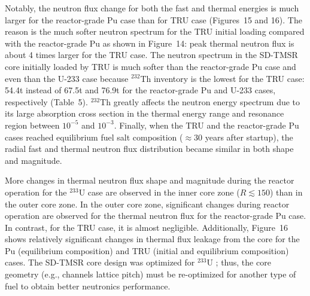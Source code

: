 \documentclass[answers,11pt]{exam}
\begin{document}
\begin{questions}
\begin{solution}
				Notably, the neutron flux change for both the fast and thermal 
				energies is much larger for the reactor-grade Pu case than for 
				TRU case (Figures~15 and 16). The reason is the much softer 
				neutron spectrum for the TRU initial loading compared with the 
				reactor-grade Pu as shown in Figure~14: peak thermal neutron 
				flux is about 4 times larger for the TRU case. The neutron 
				spectrum in the SD-TMSR core initially loaded by TRU is much 
				softer than the reactor-grade Pu case and even than the U-233 
				case because $^{232}$Th inventory is the lowest for the TRU 
				case: 54.4t instead of 67.5t and 76.9t for the reactor-grade  
				Pu and U-233 cases, respectively (Table~5). $^{232}$Th greatly 
				affects the neutron energy spectrum due to its large 
				absorption cross section in the thermal energy range and 
				resonance region between $10^{-5}$ and $10^{-3}$. Finally, 
				when the TRU and the reactor-grade Pu cases reached 
				equilibrium fuel salt composition ($\approx 30$ years after 
				startup), the radial fast and thermal neutron flux 
				distribution became similar in both shape and magnitude.
				
				More changes in thermal neutron flux shape and magnitude 
				during the reactor operation for the $^{233}$U case are 
				observed in the inner core zone ($R\lesssim150$) than in the 
				outer core zone. In the outer core zone, significant changes 
				during reactor operation are observed for the thermal 
				neutron flux for the reactor-grade Pu case. In contrast, for 
				the TRU case, it is almost negligible. Additionally, 
				Figure~16 shows relatively significant changes in thermal flux 
				leakage from the core for the Pu (equilibrium composition) and 
				TRU (initial and equilibrium composition) cases. The SD-TMSR 
				core design was optimized for $^{233}$U  				
				\cite{li_optimization_2018}; thus, the core geometry (e.g., 
				channels lattice pitch) must be re-optimized for another type 
				of fuel to obtain better neutronics performance.
        \end{solution}


\end{questions}
\end{document}
